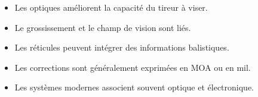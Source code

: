 \begin{aretenir}

\begin{itemize}
    \item Les optiques améliorent la capacité du tireur à viser.
    \item Le grossissement et le champ de vision sont liés.
    \item Les réticules peuvent intégrer des informations balistiques.
    \item Les corrections sont généralement exprimées en MOA ou en mil.
    \item Les systèmes modernes associent souvent optique et électronique.
\end{itemize}

\end{aretenir}
